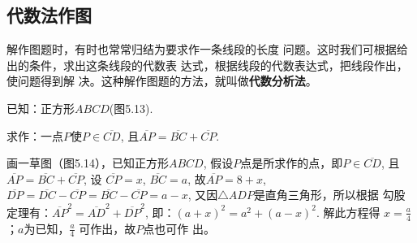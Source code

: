 \subsection{代数法作图}
解作图题时，有时也常常归结为要求作一条线段的长度
问题。这时我们可根据给出的条件，求出这条线段的代数表
达式，根据线段的代数表达式，把线段作出，使问题得到解
决。这种解作图题的方法，就叫做\textbf{代数分析法}。

\begin{example}
    已知：正方形$ABCD$(图5.13).

    求作：一点$P$使$P\in \overline{CD}$, 且$\overline{AP}=\overline{BC}+\overline{CP}$.
\end{example}

\begin{figure}[htp]\centering
    \begin{minipage}[t]{0.48\textwidth}
    \centering
{}
    \caption{}
    \end{minipage}
    \begin{minipage}[t]{0.48\textwidth}
    \centering
    \caption{}
    \end{minipage}
    \end{figure}

\begin{analyze}
    画一草图（图5.14），已知正方形$ABCD$, 假设$P$点是所求作的点，即$P\in \overline{CD}$, 且$\overline{AP}=\overline{BC}+
    \overline{CP}$, 设
    $\overline{CP}=x$, $\overline{BC}=a$, 故$\overline{AP}=8+x$, $\overline{DP}=\overline{DC}-\overline{CP}=\overline{BC}-\overline{CP}=a-x$, 又因$\triangle ADP$是直角三角形，所以根据
    勾股定理有：$\overline{AP}^2=\overline{AD}^2+\overline{DP}^2$, 即：$(a+x)^2=a^2+(a-x)^2$.
    解此方程得
    $x=\frac{a}{4}$；$a$为已知，$\frac{a}{4}$
    可作出，故$P$点也可作
    出。
\end{analyze}

